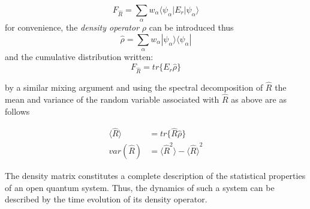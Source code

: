 \documentclass[reqno]{amsart}
\newcommand{\dens}{\hat{\rho}}
\begin{document}
\begin{equation}
	F_{\hat{R}} = \sum_\alpha w_\alpha \langle \psi_\alpha | E_r | \psi_\alpha \rangle
\end{equation}
for convenience, the \emph{density operator} $\rho$ can be introduced thus
\begin{equation}
	\dens = \sum_\alpha w_\alpha |\psi_\alpha \rangle \langle \psi_\alpha |
\end{equation}
and the cumulative distribution written:
\begin{equation}
	F_{\hat{R}} = tr\{E_r \dens\}
\end{equation}

by a similar mixing argument and using the spectral decomposition of $\hat{R}$ the mean and variance of the random variable associated with $\hat{R}$ as above are as follows

\begin{align}
	\langle \hat{R} \rangle &= tr\{\hat{R} \dens\} \\
	var(\hat{R}) &= \langle \hat{R}^2 \rangle - {\langle \hat{R} \rangle}^2
\end{align}

The density matrix constitutes a complete description of the statistical properties of an open quantum system. Thus, the dynamics of such a system can be described by the time evolution of its density operator.





\printbibliography
\end{document}
